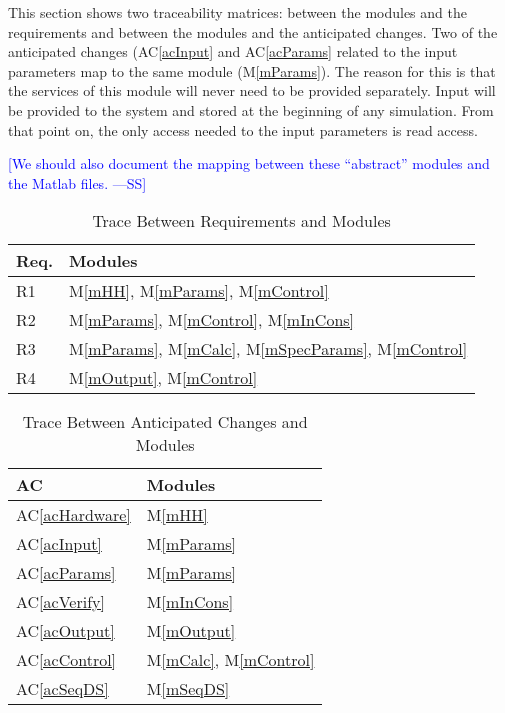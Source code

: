 \documentclass[12pt]{article}
\newcommand{\authornote}[3]{\textcolor{#1}{[#3 ---#2]}}
\newcommand{\authornote}[3]{}
\newcommand{\wss}[1]{\authornote{blue}{SS}{#1}}
\newcommand{\acref}[1]{AC\ref{#1}}
\newcommand{\mref}[1]{M\ref{#1}}
\begin{document}
This section shows two traceability matrices: between the modules and the
requirements and between the modules and the anticipated changes. Two of the 
anticipated changes (\acref{acInput} and \acref{acParams} related to the input 
parameters map to the same module (\mref{mParams}). The reason for this is that 
the services of this module will never need to be provided separately.  Input 
will be provided to the system and stored at the beginning of any simulation.  
From that point on, the only access needed to the input parameters is read 
access.

\wss{We should also document the mapping between these ``abstract'' modules and
  the Matlab files.}

\begin{table}[H]
\centering
\begin{tabular}{p{} p{}}
\toprule
\textbf{Req.} & \textbf{Modules}\\
\midrule
R1 & \mref{mHH}, \mref{mParams}, \mref{mControl}\\ %
R2 & \mref{mParams}, \mref{mControl}, \mref{mInCons}\\
R3 & \mref{mParams}, \mref{mCalc}, \mref{mSpecParams}, \mref{mControl}\\
R4 & \mref{mOutput}, \mref{mControl}\\
\bottomrule
\end{tabular}
\caption{Trace Between Requirements and Modules}
\label{TblRT}
\end{table}

\begin{table}[H]
\centering
\begin{tabular}{p{} p{}}
\toprule
\textbf{AC} & \textbf{Modules}\\
\midrule
\acref{acHardware} & \mref{mHH}\\
\acref{acInput} & \mref{mParams}\\ %
\acref{acParams} & \mref{mParams}\\
\acref{acVerify} & \mref{mInCons}\\
\acref{acOutput} & \mref{mOutput}\\
\acref{acControl} & \mref{mCalc}, \mref{mControl}\\
\acref{acSeqDS} & \mref{mSeqDS}\\
\bottomrule
\end{tabular}
\caption{Trace Between Anticipated Changes and Modules}
\label{TblACT}
\end{table}
\end{document}
